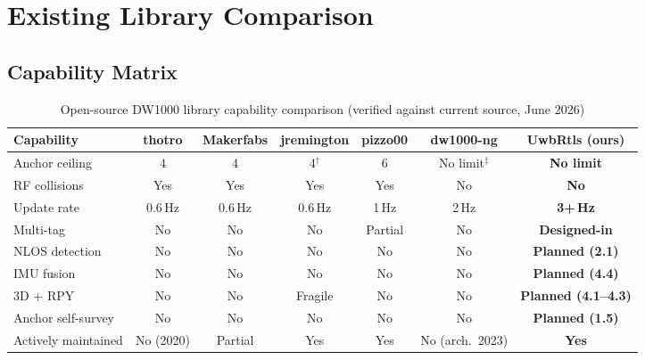 \documentclass[11pt,a4paper]{article}
\begin{document}
\section{Existing Library Comparison}

\subsection{Capability Matrix}

\begin{table}[ht]
\centering
\caption{Open-source DW1000 library capability comparison (verified against current source, June 2026)}
\renewcommand{\arraystretch}{1.2}
\begin{tabular}{lcccccc}
\toprule
\textbf{Capability} & \textbf{thotro} & \textbf{Makerfabs} & \textbf{jremington} & \textbf{pizzo00} & \textbf{dw1000-ng} & \textbf{UwbRtls (ours)} \\
\midrule
Anchor ceiling       & 4         & 4         & 4$^\dagger$ & 6         & No limit$^\ddagger$ & \textbf{No limit} \\
RF collisions        & Yes       & Yes       & Yes         & Yes       & No            & \textbf{No} \\
Update rate          & 0.6\,Hz   & 0.6\,Hz   & 0.6\,Hz     & 1\,Hz     & 2\,Hz          & \textbf{3+\,Hz} \\
Multi-tag            & No        & No        & No          & Partial   & No             & \textbf{Designed-in} \\
NLOS detection       & No        & No        & No          & No        & No             & \textbf{Planned (2.1)} \\
IMU fusion           & No        & No        & No          & No        & No             & \textbf{Planned (4.4)} \\
3D + RPY             & No        & No        & Fragile     & No        & No             & \textbf{Planned (4.1--4.3)} \\
Anchor self-survey   & No        & No        & No          & No        & No             & \textbf{Planned (1.5)} \\
Actively maintained  & No (2020) & Partial   & Yes         & Yes       & No (arch.\ 2023) & \textbf{Yes} \\
\bottomrule
\end{tabular}
\end{table}
\end{document}
